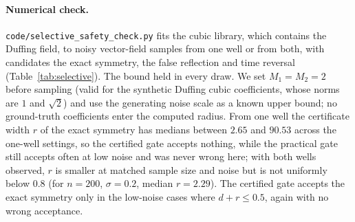 \paragraph{Numerical check.} \texttt{code/selective\_safety\_check.py} fits the cubic library, which contains the Duffing field, to noisy vector-field samples from one well or from both, with candidates the exact symmetry, the false reflection and time reversal (Table~\ref{tab:selective}). The bound held in every draw. We set $M_1=M_2=2$ before sampling (valid for the synthetic Duffing cubic coefficients, whose norms are $1$ and $\sqrt 2$) and use the generating noise scale as a known upper bound; no ground-truth coefficients enter the computed radius. From one well the certificate width $r$ of the exact symmetry has medians between $2.65$ and $90.53$ across the one-well settings, so the certified gate accepts nothing, while the practical gate still accepts often at low noise and was never wrong here; with both wells observed, $r$ is smaller at matched sample size and noise but is not uniformly below $0.8$ (for $n=200$, $\sigma=0.2$, median $r=2.29$). The certified gate accepts the exact symmetry only in the low-noise cases where $d+r\le0.5$, again with no wrong acceptance.
